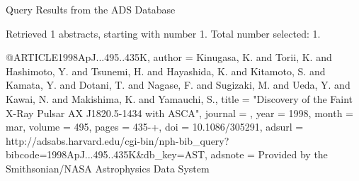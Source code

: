 Query Results from the ADS Database


Retrieved 1 abstracts, starting with number 1.  Total number selected: 1.

@ARTICLE{1998ApJ...495..435K,
   author = {{Kinugasa}, K. and {Torii}, K. and {Hashimoto}, Y. and {Tsunemi}, H. and 
	{Hayashida}, K. and {Kitamoto}, S. and {Kamata}, Y. and {Dotani}, T. and 
	{Nagase}, F. and {Sugizaki}, M. and {Ueda}, Y. and {Kawai}, N. and 
	{Makishima}, K. and {Yamauchi}, S.},
    title = "{Discovery of the Faint X-Ray Pulsar AX J1820.5-1434 with ASCA}",
  journal = {\apj},
     year = 1998,
    month = mar,
   volume = 495,
    pages = {435-+},
      doi = {10.1086/305291},
   adsurl = {http://adsabs.harvard.edu/cgi-bin/nph-bib_query?bibcode=1998ApJ...495..435K&db_key=AST},
  adsnote = {Provided by the Smithsonian/NASA Astrophysics Data System}
}


